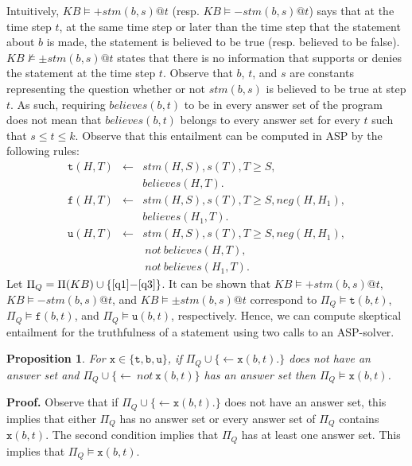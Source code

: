 \documentclass{article}
\newtheorem{proposition}[theorem]{Proposition}
\def\naf{\: {not} \:}
\begin{document}
Intuitively, $KB  \models {+}stm(b,s)@t$ (resp. $KB  \models {-}stm(b,s)@t$) says that at the time step $t$, at the same time step or later than the time step that the statement about $b$ is made, the statement is believed to be true (resp. believed to be false). $KB \not\models {\pm}stm(b,s)@t$ states that there is no information that supports or denies the statement at the time step $t$. Observe that $b$, $t$, and $s$ are constants representing the question whether or not $stm(b,s)$ is believed to be true at step $t$. As such, requiring $believes(b,t)$ to be in every answer set of the program 
does not mean that $believes(b,t)$ belongs to every answer set for every $t$ such that $s \le t \le k$. 
Observe that this entailment can be computed in ASP by the following rules: 
%
{
\begin{eqnarray}
\mathtt{t}(H, T) & \leftarrow & stm(H, S), s(T), T \ge S, \nonumber \\
        &  & believes(H, T). \label{q1} \\ 
\mathtt{f}(H, T) & \leftarrow & stm(H, S), s(T), T \ge S, neg(H,H_1),  \nonumber\\ 
& & believes(H_1, T).  \label{q2}\\
\mathtt{u}(H, T) & \leftarrow & stm(H, S), s(T), T \ge S, neg(H,H_1), \nonumber  \\
& & \naf believes(H, T), \nonumber \\
&&  \naf believes(H_1, T). \label{q3}
\end{eqnarray}
}
%
Let $\Pi_Q = \Pi(KB) \cup \{\eqref{q1}{-}\eqref{q3}\}$. It can be shown that 
 $KB  \models {+}stm(b,s)@t$, $KB  \models {-}stm(b,s)@t$, and  $KB  \models {\pm}stm(b,s)@t$ 
 correspond to $\Pi_Q \models \mathtt{t}(b,t)$, $\Pi_Q \models \mathtt{f}(b,t)$, and 
 $\Pi_Q \models \mathtt{u}(b,t)$, respectively. Hence, we can compute skeptical entailment for the truthfulness of a statement 
using two calls to an ASP-solver. 
 

\begin{proposition} 
For $\mathtt{x} \in \{\mathtt{t, b, u}\}$,
if  $\Pi_Q \cup \{\leftarrow  \mathtt{x}(b,t).\}$ does not have an answer set and  
$\Pi_Q \cup \{\leftarrow \naf \mathtt{x}(b,t)\}$   has an answer set then   $\Pi_Q \models \mathtt{x}(b, t)$. 
\end{proposition}  
% 
\noindent
{\bf Proof.}
Observe that if $\Pi_Q \cup \{\leftarrow \mathtt{x}(b,t).\}$ does not have an answer set, this
implies that  either $\Pi_Q$ has no answer set or every answer set of $\Pi_Q$
contains $\mathtt{x}(b,t)$. The second condition implies that $\Pi_Q$ has at least one answer set. 
This implies that  $\Pi_Q \models \mathtt{x}(b, t)$.  
\hfill\qedsymbol{}
\end{document}
